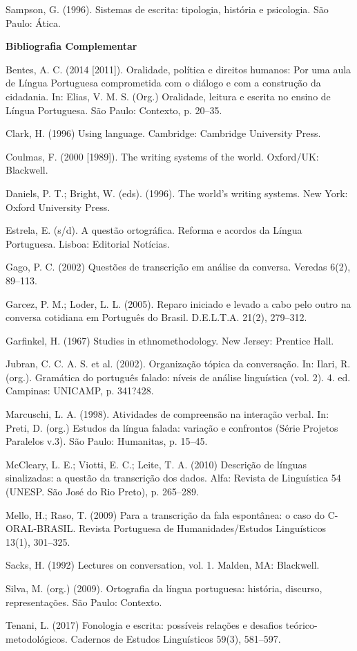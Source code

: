 \documentclass[a4paper,12pt]{article}
\newcommand{\n}{\noindent}
\begin{document}
{\begin{hangparas}{.25in}{1}
Sampson, G. (1996). Sistemas de escrita: tipologia, história e psicologia. São Paulo: Ática. 

\end{hangparas}

\bigskip 
\n \textbf{Bibliografia Complementar} \bigskip 

 \begin{hangparas}{.25in}{1}
\n Bentes, A. C. (2014 [2011]). Oralidade, política e direitos humanos: Por uma aula de Língua Portuguesa comprometida com o diálogo e com a construção da cidadania. In: Elias, V. M. S. (Org.) Oralidade, leitura e escrita no ensino de Língua Portuguesa. São Paulo: Contexto, p. 20--35.

\n Clark, H. (1996) Using language. Cambridge: Cambridge University Press.

Coulmas, F. (2000 [1989]). The writing systems of the world. Oxford/UK: Blackwell.

Daniels, P. T.; Bright, W. (eds). (1996). The world's writing systems. New York: Oxford University Press.

Estrela, E. (s/d). A questão ortográfica. Reforma e acordos da Língua Portuguesa. Lisboa: Editorial Notícias.

Gago, P. C. (2002) Questões de transcrição em análise da conversa. Veredas 6(2), 89--113.

Garcez, P. M.; Loder, L. L. (2005). Reparo iniciado e levado a cabo pelo outro na conversa cotidiana em Português do Brasil. D.E.L.T.A. 21(2), 279--312.

Garfinkel, H. (1967) Studies in ethnomethodology. New Jersey: Prentice Hall. 

Jubran, C. C. A. S. et al. (2002). Organização tópica da conversação. In: Ilari, R. (org.). Gramática do português falado: níveis de análise linguística (vol. 2). 4. ed. Campinas: UNICAMP, p. 341?428.

Marcuschi, L. A. (1998). Atividades de compreensão na interação verbal. In: Preti, D. (org.) Estudos da língua falada: variação e confrontos (Série Projetos Paralelos v.3). São Paulo: Humanitas, p. 15--45.

McCleary, L. E.; Viotti, E. C.; Leite, T. A. (2010) Descrição de línguas sinalizadas: a questão da transcrição dos dados. Alfa: Revista de Linguística 54 (UNESP. São José do Rio Preto), p. 265--289.

Mello, H.; Raso, T. (2009) Para a transcrição da fala espontânea: o caso do C-ORAL-BRASIL. Revista Portuguesa de Humanidades/Estudos Linguísticos 13(1), 301--325.

Sacks, H. (1992) Lectures on conversation, vol. 1. Malden, MA: Blackwell.
 
Silva, M. (org.) (2009). Ortografia da língua portuguesa: história, discurso, representações. São Paulo: Contexto.

Tenani, L. (2017) Fonologia e escrita: possíveis relações e desafios teórico-metodológicos. Cadernos de Estudos Linguísticos 59(3), 581--597.
\end{hangparas}
}
\end{document}
